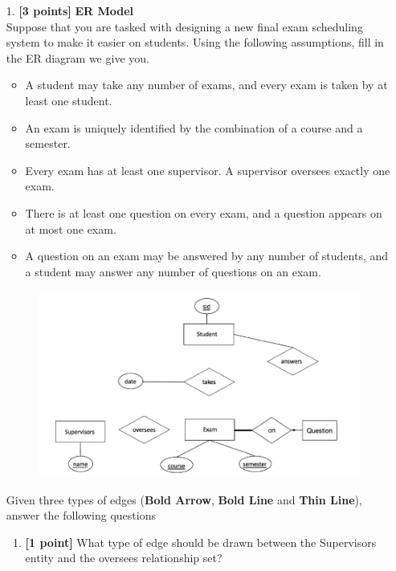 \documentclass[10pt]{article}
\begin{document}
\begin{enumerate}
    \item[1.] \textbf{[3 points]} \textbf{ER Model} \\
        Suppose that you are tasked with designing a new final exam scheduling system to make it
        easier on students. Using the following assumptions, fill in the ER diagram we give you.
        \begin{itemize}
            \item A student may take any number of exams, and every exam is taken by at least one student.
            \item An exam is uniquely identified by the combination of a course and a semester.
            \item Every exam has at least one supervisor. A supervisor oversees exactly one exam.
            \item There is at least one question on every exam, and a question appears on at most one exam.
            \item A question on an exam may be answered by any number of students, and a student may answer any number of questions on an exam.
        \end{itemize}
        \begin{figure}[ht]
            \centering
            \includegraphics[width=0.85\linewidth]{er_model}
        \end{figure}
        Given three types of edges (\textbf{Bold Arrow}, \textbf{Bold Line} and \textbf{Thin Line}), answer the following questions
        \begin{enumerate}
            \item\textbf{[1 point]} What type of edge should be drawn between the Supervisors entity and the oversees relationship set? \\ \\ \\ \\

\end{enumerate}
\end{enumerate}
\end{document}
